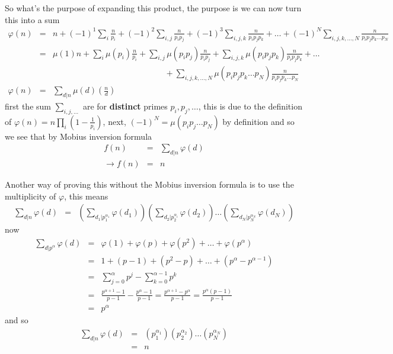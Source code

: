 \documentclass[aps,preprint,preprintnumbers,nofootinbib,showpacs,prd]{revtex4-1}
\newcommand{\nbea}{\begin{eqnarray*}}
\newcommand{\neea}{\end{eqnarray*}}
\begin{document}
So what's the purpose of expanding this product, the purpose is we can now turn this into a sum
%
\nbea
\varphi(n) & = & n + (-1)^1\sum_{i}\frac{n}{p_i} + (-1)^2\sum_{i,j}\frac{n}{p_i p_j} +(-1)^3\sum_{i,j,k}\frac{n}{p_i p_j p_k} + \ldots + (-1)^N\sum_{i,j,k,\ldots,N} \frac{n}{p_i p_j p_k \ldots p_N} \\
& = & \mu(1)n + \sum_{i}\mu(p_i)\frac{n}{p_i} + \sum_{i,j}\mu(p_ip_j)\frac{n}{p_i p_j} + \sum_{i,j,k} \mu(p_ip_jp_k)\frac{n}{p_i p_j p_k} + \ldots \\
&& ~~~~~~~~~~~~~~~~~~~~~~~~~~~~~~~~~~~~~~~~~~~~~~~~~~~~~~~~~~~~~ + \sum_{i,j,k,\ldots,N} \mu(p_i p_j p_k \ldots p_N)\frac{n}{p_i p_j p_k \ldots p_N} \\
\varphi(n) & = & \sum_{d|n}\mu(d)\left ( \frac{n}{d}\right )
\neea
%
first the sum $\sum_{i,j,\ldots}$ are for {\bf distinct} primes $p_i,p_j,\ldots$, this is due to the definition of $\varphi(n) = n\prod_i\left(1-\frac{1}{p_i}\right)$, next, $(-1)^N = \mu(p_i p_j\ldots p_N)$ by definition and so we see that by Mobius inversion formula
%
\nbea
f(n) & = & \sum_{d|n}\varphi(d) \\
\to f(n) & = & n
\neea
%



Another way of proving this without the Mobius inversion formula is to use the multiplicity of $\varphi$, this means
%
\nbea
\sum_{d|n} \varphi(d) & = & \left(\sum_{d_1|p_1^{\alpha_1}}\varphi(d_1)\right)\left(\sum_{d_2|p_2^{\alpha_i}}\varphi(d_2)\right) \ldots \left(\sum_{d_N|p_N^{\alpha_N}}\varphi(d_N)\right)
\neea
%
now
%
\nbea
\sum_{d|p^{\alpha}}\varphi(d) & = & \varphi(1) + \varphi(p) + \varphi(p^2) + \ldots + \varphi(p^\alpha) \\
& = & 1 + (p-1) + (p^2 - p) + \ldots + (p^\alpha - p^{\alpha-1}) \\
& = & \sum_{j=0}^\alpha p^j - \sum_{k=0}^{\alpha-1}p^k \\
& = & \frac{p^{\alpha+1}-1}{p-1} - \frac{p^{\alpha}-1}{p-1} = \frac{p^{\alpha+1}-p^\alpha}{p-1} = \frac{p^{\alpha}(p-1)}{p-1}\\
& = & p^\alpha
\neea
%
and so
%
\nbea
\sum_{d|n} \varphi(d) & = & \left(p_1^{\alpha_1}\right)\left(p_2^{\alpha_2}\right) \ldots \left(p_N^{\alpha_N}\right) \\
& = & n
\neea
%
\end{document}
